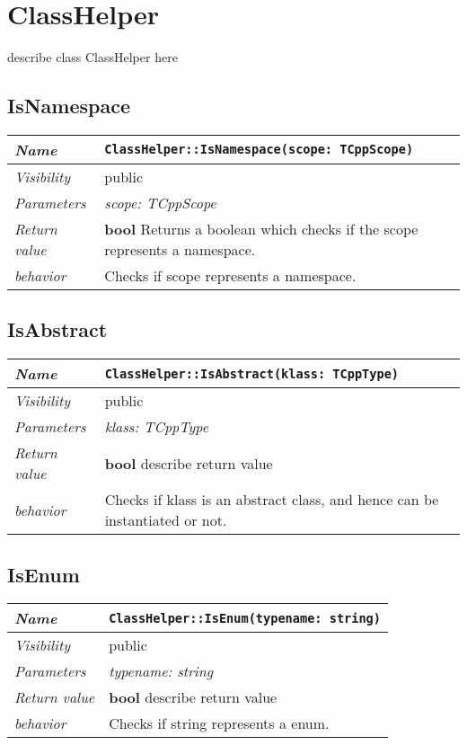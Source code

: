 \chapter{ClassHelper}
describe class ClassHelper here
\section{IsNamespace}
\begin{longtable}{p{3cm} @{\hskip 1cm} p{12cm}}
 \hline
\textit{Name} & \texttt{ClassHelper::IsNamespace(scope: TCppScope)}\\
\hline
 \textit{Visibility} & public\\
\hline
\textit{Parameters} & \textit{scope: TCppScope}\\
\hline
\textit{Return value} & \textbf{ bool} Returns a boolean which checks if the scope represents a namespace.\\
  \hline
 \textit{behavior} & Checks if scope represents a namespace. \\
\hline
\end{longtable} \pagebreak
 \section{IsAbstract}
\begin{longtable}{p{3cm} @{\hskip 1cm} p{12cm}}
 \hline
\textit{Name} & \texttt{ClassHelper::IsAbstract(klass: TCppType)}\\
\hline
 \textit{Visibility} & public\\
\hline
\textit{Parameters} & \textit{klass: TCppType}\\
\hline
\textit{Return value} & \textbf{ bool} describe return value\\
  \hline
 \textit{behavior} & Checks if klass is an abstract class, and hence can be instantiated or not. \\
\hline
\end{longtable} \pagebreak
 \section{IsEnum}
\begin{longtable}{p{3cm} @{\hskip 1cm} p{12cm}}
 \hline
\textit{Name} & \texttt{ClassHelper::IsEnum(typename: string)}\\
\hline
 \textit{Visibility} & public\\
\hline
\textit{Parameters} & \textit{typename: string}\\
\hline
\textit{Return value} & \textbf{ bool} describe return value\\
  \hline
 \textit{behavior} & Checks if string represents a enum. \\
\hline
\end{longtable} \pagebreak
